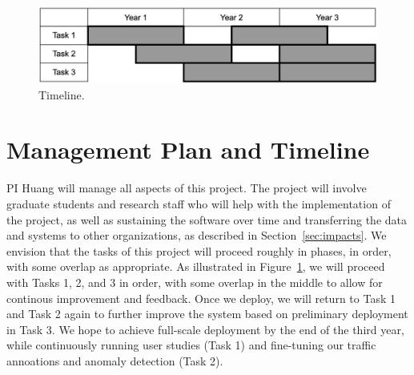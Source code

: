 \begin{figure}[t]
    \centering
    \includegraphics[width=0.6\linewidth]{figures/timeline.png}
    \caption{Timeline.}
    \label{fig:timeline}
\end{figure}


\section{Management Plan and Timeline}\label{sec:management}

PI Huang will manage all aspects of this project. The project will involve
graduate students and research staff who will help with the implementation of
the project, as well as sustaining the software over time and transferring the
data and systems to other organizations, as described in
Section~\ref{sec:impacts}. We envision that the tasks of this project will
proceed roughly in phases, in order, with some overlap as appropriate. As illustrated in Figure~\ref{fig:timeline}, we will proceed with Tasks 1, 2, and 3 in order, with some overlap in the middle to allow for continous improvement and feedback. Once we deploy, we will return to Task 1 and Task 2 again to further improve the system based on preliminary deployment in Task 3. We hope to achieve full-scale deployment by the end of the third year, while continuously running user studies (Task 1) and fine-tuning our traffic annoations and anomaly detection (Task 2).
